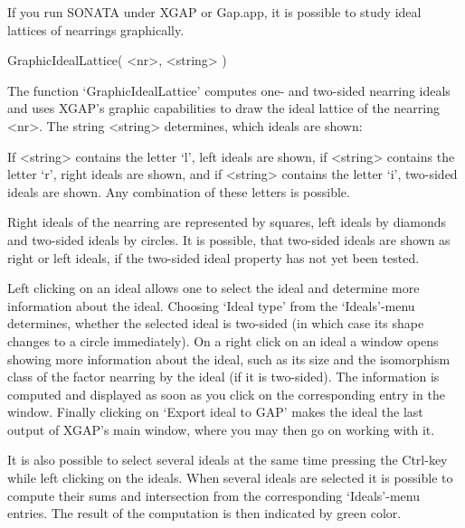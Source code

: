 %
%

If you run SONATA under XGAP or Gap.app, it is possible to study ideal lattices of
nearrings graphically.

\>GraphicIdealLattice( <nr>, <string> )

The function `GraphicIdealLattice' computes one- and two-sided
nearring ideals and uses XGAP's graphic capabilities to draw the ideal
lattice of the nearring <nr>. The string <string> determines, which
ideals are shown:

If <string> contains the letter `l', left ideals are shown, if
<string> contains the letter `r', right ideals are shown, and if
<string> contains the letter `i', two-sided ideals are shown.  Any
combination of these letters is possible.

Right ideals of the nearring are represented by squares, left ideals
by diamonds and two-sided ideals by circles. It is possible, that
two-sided ideals are shown as right or left ideals, if the two-sided
ideal property has not yet been tested.

Left clicking on an ideal allows one to select the ideal and determine
more information about the ideal. Choosing `Ideal type' from the
`Ideals'-menu determines, whether the selected ideal is two-sided (in
which case its shape changes to a circle immediately). On a right
click on an ideal a window opens showing more information about the
ideal, such as its size and the isomorphism class of the factor
nearring by the ideal (if it is two-sided). The information is
computed and displayed as soon as you click on the corresponding entry
in the window. Finally clicking on `Export ideal to GAP' makes the
ideal the last output of XGAP's main window, where you may then go on
working with it.

It is also possible to select several ideals at the same time pressing
the Ctrl-key while left clicking on the ideals. When several ideals
are selected it is possible to compute their sums and intersection
from the corresponding `Ideals'-menu entries. The result of the
computation is then indicated by green color.

